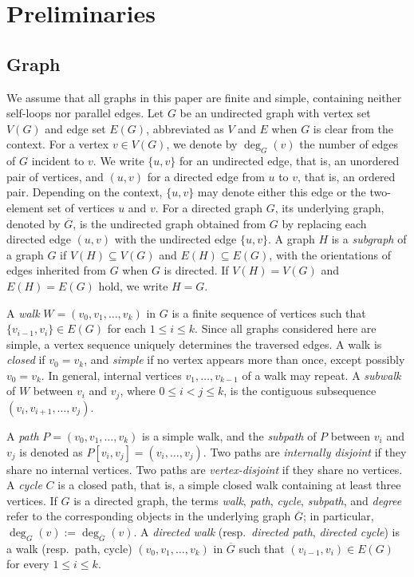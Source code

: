 \documentclass[pdflatex,sn-mathphys-num]{sn-jnl}
\theoremstyle{thmstyleone}%
\theoremstyle{thmstyletwo}%
\theoremstyle{thmstylethree}%
\begin{document}
\section{Preliminaries}\label{sec:background}


\subsection{Graph}
We assume that all graphs in this paper are finite and simple, containing neither self-loops nor parallel edges. Let $G$ be an undirected graph with vertex set $V(G)$ and edge set $E(G)$, abbreviated as $V$ and $E$ when $G$ is clear from the context. For a vertex $v \in V(G)$, we denote by $\deg_G(v)$ the number of edges of $G$ incident to $v$. We write $\{u,v\}$ for an undirected edge, that is, an unordered pair of vertices, and $(u,v)$ for a directed edge from $u$ to $v$, that is, an ordered pair. Depending on the context, $\{u,v\}$ may denote either this edge or the two-element set of vertices $u$ and $v$. For a directed graph $G$, its underlying graph, denoted by $\overline{G}$, is the undirected graph obtained from $G$ by replacing each directed edge $(u,v)$ with the undirected edge $\{u,v\}$. A graph $H$ is a \emph{subgraph} of a graph $G$ if $V(H)\subseteq V(G)$ and $E(H)\subseteq E(G)$, with the orientations of edges inherited from $G$ when $G$ is directed. If $V(H)=V(G)$ and $E(H)=E(G)$ hold, we write $H=G$.


A \emph{walk} $W = (v_0, v_1, \dots, v_k)$ in $G$ is a finite sequence of vertices such that $\{v_{i-1}, v_i\} \in E(G)$ for each $1 \le i \le k$. Since all graphs considered here are simple, a vertex sequence uniquely determines the traversed edges. A walk is \emph{closed} if $v_0 = v_k$, and \emph{simple} if no vertex appears more than once, except possibly $v_0 = v_k$. In general, internal vertices $v_1, \dots, v_{k-1}$ of a walk may repeat. 
A \emph{subwalk} of $W$ between $v_i$ and $v_j$, where $0 \leq i<j \leq k$, is the contiguous subsequence $(v_i,v_{i+1},\dots,v_j)$.

A \emph{path} $P=(v_0, v_1, \dots, v_k)$ is a simple walk, and the \emph{subpath} of $P$ between $v_i$ and $v_j$ is denoted as $P[v_i,v_j] = (v_i, \dots, v_j)$. Two paths are \emph{internally disjoint} if they share no internal vertices. Two paths are \emph{vertex-disjoint} if they share no  vertices. A \emph{cycle} $C$ is a closed path, that is, a simple closed walk containing at least three vertices. If $G$ is a directed graph, the terms \emph{walk}, \emph{path}, \emph{cycle}, \emph{subpath}, and \emph{degree} refer to the corresponding objects in the underlying  graph $\overline{G}$; in particular, $\deg_G(v):=\deg_{\overline{G}}(v)$. A \emph{directed walk} (resp.\ \emph{directed path}, \emph{directed cycle}) is a walk (resp.\ path, cycle) $(v_0, v_1, \dots, v_k)$ in $\overline{G}$ such that $(v_{i-1}, v_i) \in E(G)$ for every $1 \le i \le k$.
\end{document}
